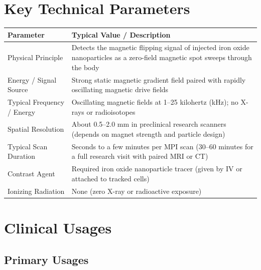 \section{Key Technical Parameters}

\noindent\begin{tabularx}{\textwidth}{@{}l X@{}}
\toprule
\textbf{Parameter} & \textbf{Typical Value / Description} \\
\midrule
Physical Principle & Detects the magnetic flipping signal of injected iron oxide nanoparticles as a zero-field magnetic spot sweeps through the body \\
Energy / Signal Source & Strong static magnetic gradient field paired with rapidly oscillating magnetic drive fields \\
Typical Frequency / Energy & Oscillating magnetic fields at 1--25 kilohertz (kHz); no X-rays or radioisotopes \\
Spatial Resolution & About 0.5--2.0 mm in preclinical research scanners (depends on magnet strength and particle design) \\
Typical Scan Duration & Seconds to a few minutes per MPI scan (30--60 minutes for a full research visit with paired MRI or CT) \\
Contrast Agent & Required iron oxide nanoparticle tracer (given by IV or attached to tracked cells) \\
Ionizing Radiation & None (zero X-ray or radioactive exposure) \\
\bottomrule
\end{tabularx}

\section{Clinical Usages}

\subsection{Primary Usages}

